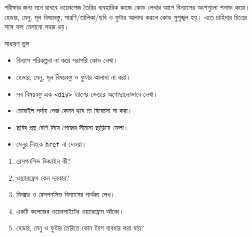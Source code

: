 \begin{boardbox}{পরীক্ষার জন্য মনে রাখবে}
ওয়েবপেজ তৈরির ব্যবহারিক কাজে কোড লেখার আগে বিন্যাসের অংশগুলো শনাক্ত করো। হেডার, মেনু, মূল বিষয়বস্তু, সারণি/তালিকা/ছবি ও ফুটার আলাদা করলে কোড সুশৃঙ্খল হয়। এতে চাহিদার চিত্রের সঙ্গে ফল মেলানো সহজ হয়।
\end{boardbox}

\begin{mistakebox}{সাধারণ ভুল}
\par\noindent
\begin{minipage}[t]{.48\linewidth}\vspace{0pt}
\begin{itemize}
\item বিন্যাস পরিকল্পনা না করে সরাসরি কোড লেখা।
\item হেডার, মেনু, মূল বিষয়বস্তু ও ফুটার আলাদা না করা।
\item সব বিষয়বস্তু এক \texttt{<div>} ট্যাগের ভেতরে অগোছালোভাবে লেখা।
\end{itemize}
\end{minipage}\hfill
\begin{minipage}[t]{.48\linewidth}\vspace{0pt}
\begin{itemize}
\item মোবাইল পর্দায় পেজ কেমন হবে তা বিবেচনা না করা।
\item ছবির প্রস্থ বেশি দিয়ে পেজের সীমানা ছাড়িয়ে ফেলা।
\item মেনুর লিংকে \texttt{href} না দেওয়া।
\end{itemize}
\end{minipage}\par

\end{mistakebox}

\begin{practicebox}
\begin{enumerate}
\item রেসপনসিভ ডিজাইন কী?
\item ওয়্যারফ্রেম কেন দরকার?
\item ফিক্সড ও রেসপনসিভ বিন্যাসের পার্থক্য লেখ।
\item একটি কলেজের ওয়েবসাইটের ওয়্যারফ্রেম আঁকো।
\item হেডার, মেনু ও ফুটার তৈরিতে কোন ট্যাগ ব্যবহার করা যায়?
\end{enumerate}
\end{practicebox}
